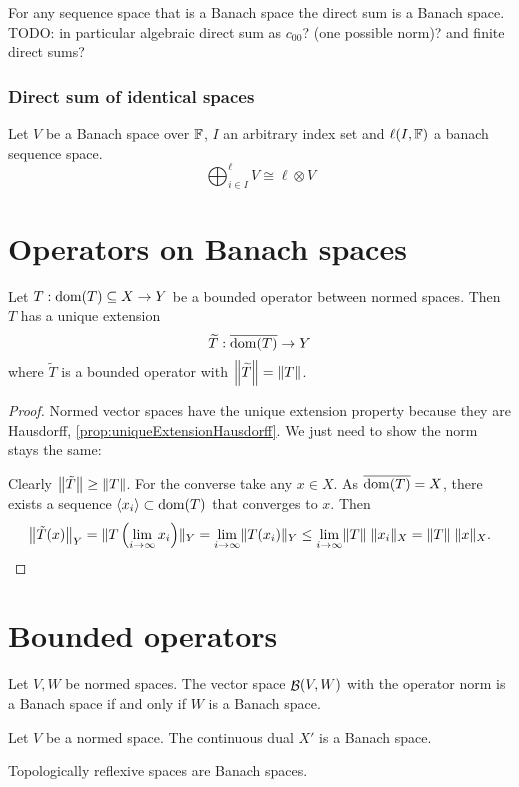 \begin{proposition}
For any sequence space that is a Banach space the direct sum is a Banach space. TODO: in particular algebraic direct sum as $c_{00}$? (one possible norm)? and finite direct sums?
\end{proposition}

\subsubsection{Direct sum of identical spaces}
\begin{proposition}
Let $V$ be a Banach space over $\F$, $I$ an arbitrary index set and $\ell(I,\F)$ a banach sequence space.
\[ \bigoplus_{i\in I}^\ell V \cong \ell\otimes V \]
\end{proposition}


\section{Operators on Banach spaces}
\begin{proposition} \label{prop:BLT}
Let $T:\dom(T)\subseteq X\to Y$ be a bounded operator between normed spaces. Then $T$ has a unique extension
\[ \widetilde{T}:\overline{\dom(T)}\to Y \]
where $\widetilde{T}$ is a bounded operator with $\norm*{\widetilde{T}} = \norm{T}$.
\end{proposition}
\begin{proof}
Normed vector spaces have the unique extension property because they are Hausdorff, \ref{prop:uniqueExtensionHausdorff}. We just need to show the norm stays the same:

Clearly $\norm*{\tilde{T}} \geq \norm{T}$. For the converse take any $x\in X$. As $\overline{\dom(T)} = X$, there exists a sequence $\seq{x_i}\subset \dom(T)$ that converges to $x$. Then
\[ \norm*{\tilde{T}(x)}_Y = \norm{T\left(\lim_{i\to\infty}x_i\right)}_Y = \lim_{i\to\infty}\norm{T(x_i)}_Y \leq \lim_{i\to\infty}\norm{T}\;\norm{x_i}_X = \norm{T}\;\norm{x}_X. \]
\end{proof}

\section{Bounded operators}
\begin{proposition}
Let $V,W$ be normed spaces. The vector space $\Bounded(V,W)$ with the operator norm is a Banach space \textup{if and only if} $W$ is a Banach space.
\end{proposition}
\begin{corollary}
Let $V$ be a normed space. The continuous dual $X'$ is a Banach space.
\end{corollary}
\begin{corollary}
Topologically reflexive spaces are Banach spaces.
\end{corollary}

